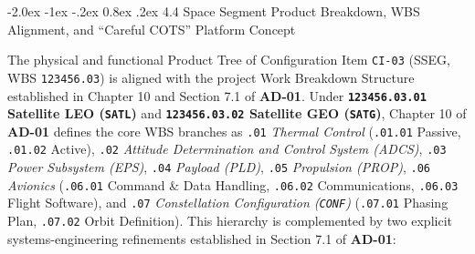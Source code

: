 \documentclass[11pt,a4paper]{article}
\makeatletter
\renewcommand\subsubsection{\@startsection{subsubsection}{3}{\z@}%
    {-2.0ex \@plus -1ex \@minus -.2ex}%
    {0.8ex \@plus .2ex}%
    {\normalfont\normalsize\bfseries\sffamily\color{SubHeadingBlue}}}
\providecommand{\abbr}[1]{#1}
\makeatother
\begin{document}
\subsubsection{4.4 Space Segment Product Breakdown, WBS Alignment, and ``Careful COTS'' Platform Concept}

The physical and functional Product Tree of Configuration Item \texttt{CI-03} (\abbr{SSEG}, \abbr{WBS} \texttt{123456.03}) is aligned with the project Work Breakdown Structure established in Chapter 10 and Section 7.1 of \textbf{AD-01}. Under \textbf{\texttt{123456.03.01} Satellite \abbr{LEO} (\texttt{SATL})} and \textbf{\texttt{123456.03.02} Satellite \abbr{GEO} (\texttt{SATG})}, Chapter 10 of \textbf{AD-01} defines the core WBS branches as \texttt{.01} \emph{Thermal Control} (\texttt{.01.01} Passive, \texttt{.01.02} Active), \texttt{.02} \emph{Attitude Determination and Control System (\abbr{ADCS})}, \texttt{.03} \emph{Power Subsystem (\abbr{EPS})}, \texttt{.04} \emph{Payload (\abbr{PLD})}, \texttt{.05} \emph{Propulsion (\abbr{PROP})}, \texttt{.06} \emph{Avionics} (\texttt{.06.01} Command \& Data Handling, \texttt{.06.02} Communications, \texttt{.06.03} Flight Software), and \texttt{.07} \emph{Constellation Configuration (\texttt{CONF})} (\texttt{.07.01} Phasing Plan, \texttt{.07.02} Orbit Definition). This hierarchy is complemented by two explicit systems-engineering refinements established in Section 7.1 of \textbf{AD-01}:
\end{document}
